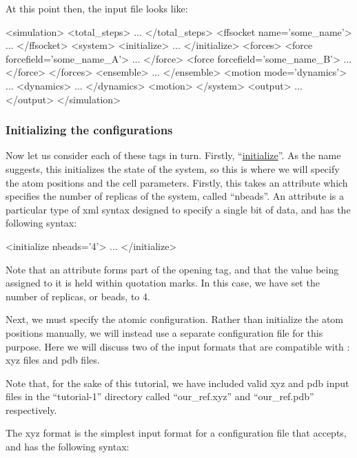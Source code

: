 \documentclass[11pt,english,fleqn]{report}
\newenvironment{code}{%
\footnotesize
\verbatim
}{
\endverbatim
\normalsize
}
\begin{document}
At this point then, the input file looks like:

\begin{code}
<simulation>
   <total_steps>
      ...
   </total_steps>
   <ffsocket name='some_name'>
      ...
   </ffsocket>
   <system>
      <initialize>
         ...
      </initialize>
      <forces>
         <force forcefield='some_name_A'>
            ...
         </force>
         <force forcefield='some_name_B'>
            ...
         </force>
      </forces>
      <ensemble>
         ...
      </ensemble>
      <motion mode='dynamics'>
         ...
         <dynamics>
            ...
         </dynamics>
      <motion>
   </system>
   <output>
      ...
   </output>
</simulation>
\end{code}

\subsubsection{Initializing the configurations}

Now let us consider each of these tags in turn. Firstly,
{}``\hyperref[INITIALIZER]{initialize}''.
As the name suggests, this initializes the state of the system, so
this is where we will specify the atom positions and the cell
parameters. Firstly, this takes an attribute which specifies the number
of replicas of the system, called {}``nbeads''. An attribute is
a particular type of xml syntax designed to specify a single bit of
data, and has the following syntax:

\begin{code}
<initialize nbeads='4'>
   ...
</initialize>
\end{code}

Note that an attribute forms part of the opening tag, and that the
value being assigned to it is held within quotation marks. In this
case, we have set the number of replicas, or beads, to 4.

Next, we must specify the atomic configuration. Rather than initialize
the atom positions manually, we will instead use a separate configuration
file for this purpose.
Here we will discuss two of the input formats that are compatible
with \ipi: xyz files and pdb files.

Note that, for the sake of this tutorial, we have
included valid xyz and pdb input
files in the {}``tutorial-1'' directory called {}``our\_ref.xyz''
and {}``our\_ref.pdb'' respectively.

The xyz format is the simplest input format
for a configuration file that \ipi accepts, and has the following
syntax:
\end{document}
